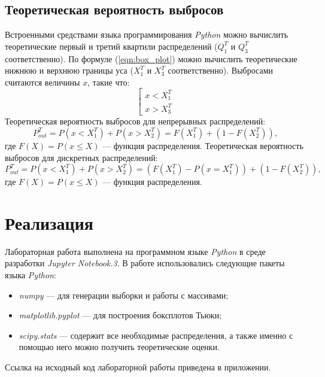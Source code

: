 \documentclass[12pt,a4paper]{article}
\begin{document}
	\subsection{Теоретическая вероятность выбросов}
		Встроенными средствами языка программирования \emph{Python} можно вычислить теоретические первый и третий квартили распределений ($Q^T_1$ и $Q^T_3$ соответственно). По формуле (\ref{eqn:box_plot}) можно вычислить теоретические нижнюю и верхнюю границы уса ($X^T_1$ и $X^T_3$ соответственно). Выбросами считаются величины $x$, такие что:
		\begin{equation}\label{eqn:outliers}
		\left[ \begin{array}{l}
			x < X^T_1 \\
			x > X^T_3
		\end{array} \right.
		\end{equation}
		Теоретическая вероятность выбросов для непрерывных распределений:
		\begin{equation}\label{eqn:continous_prob}
			P^T_{out} = P(x < X^T_1) + P(x > X^T_2) = F(X^T_1) + (1-F(X^T_2)),
		\end{equation}
		где $F(X) = P(x \leq X)$ --- функция распределения.
		Теоретическая вероятность выбросов для дискретных распределений:
		\begin{equation}\label{eqn:discrete_prob}
			P^T_{out} = P(x < X^T_1) + P(x > X^T_2) = (F(X^T_1) - P(x = X^T_1)) + (1-F(X^T_2)),
		\end{equation}
		где $F(X) = P(x \leq X)$ --- функция распределения.
		
	\section{Реализация}
	Лабораторная работа выполнена на программном языке \emph{Python} в среде разработки \emph{Jupyter Notebook.3}. В работе использовались следующие пакеты языка \emph{Python}:
	\begin{itemize}
		\item \emph{numpy} --- для генерации выборки и работы с массивами;
		
		\item \emph{matplotlib.pyplot} --- для построения боксплотов Тьюки;
		
		\item \emph{scipy.stats} --- содержит все необходимые распределения, а также именно с помощью него можно получить теоретические оценки.
	\end{itemize}
	Ссылка на исходный код лабораторной работы приведена в приложении.
\end{document}

